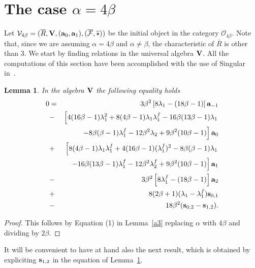 \documentclass[a4paper]{amsart}
\newtheorem{lemma}{Lemma}[section]
\newcommand{\Ro}{{\overline R}}
\newcommand{\Vo}{{\bf V}}
\newcommand{\lmu}{\lambda_1}
\newcommand{\lmf}{\lambda_1^f}
\newcommand{\lmd}{\lambda_2}
\newcommand{\lmdf}{\lambda_2^f}
\newcommand{\al}{\alpha}
\newcommand{\bt}{\beta}
\newcommand{\ba}{{\bf a}}
\newcommand{\bs}{{\bf s}}
\begin{document}
\section{ The case $\al=4\bt$}\label{al=4bt}
 
Let $\mathcal V_{4\bt}=(\Ro,\Vo, (\ba_0, \ba_1), (\overline{\mathcal F}, \overline \star))$  be the initial object in the category $\mathcal O_{4\bt}$. Note that, since we are assuming $\al=4\bt$ and $\al\neq \bt$,  the characteristic of $\Ro$ is other than $3$.
We start by finding relations in the universal algebra $\Vo$. All the computations of this section have been accomplished with the use of Singular~\cite{Singular} in~\cite[genericsakuma-4bt.s]{code}.

\begin{lemma}\label{lemma6.9}
In the algebra $\Vo$ the following equality holds
\begin{eqnarray}\label{eqs} %
0&=&3\bt^2\left[8\lmu-(18\bt-1)\right ]\ba_{-1} \nonumber \\
&-&
\left[4(16\bt-1)\lmu^2+8(4\bt-1)\lmu\lmf-16\bt(13\bt-1)\lmu \right . \nonumber \\
&& \left .-8\bt(\bt-1)\lmf-12\bt^2\lmd+9\bt^2(10\bt-1)\right ]\ba_0\nonumber \\
&+& \left [8(4\bt-1)\lmu\lmf+4(16\bt-1)(\lmf)^2-8\bt(\bt-1)\lmu \right . \nonumber \\
&& \left .-16\bt(13\bt-1)\lmf-12\bt^2\lmdf+9\bt^2(10\bt-1)\right ]\ba_1 \nonumber \\
&-&3\bt^2\left [8\lmf-(18\bt-1)\right ]\ba_2 \nonumber \\
&+&8(2\bt+1)(\lmu-\lmf)\bs_{0,1} \nonumber \\
&-&18\bt^2(\bs_{0,2}-\bs_{1,2}). \nonumber 
\end{eqnarray}
\end{lemma}
\begin{proof}
This follows by Equation (1) in Lemma~\ref{a3} replacing $\al$ with $4\bt$ and dividing by $2\bt$.
\end{proof}

It will be convenient to have at hand also the next result, which is obtained by expliciting $\bs_{1,2}$ in the equation of Lemma~\ref{lemma6.9}.
\end{document}
